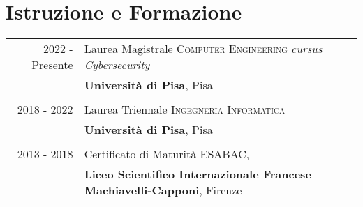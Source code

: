 \documentclass[a4paper,10pt]{article} %
\begin{document}

\section{Istruzione e Formazione}

\begin{tabular}{rl}	



2022 - Presente & Laurea Magistrale \textsc{Computer Engineering} \small\emph{cursus Cybersecurity}\\
& \textbf{Università di Pisa}, Pisa\\
&\\


2018 - 2022 & Laurea Triennale \textsc{Ingegneria Informatica}\\%
&\textbf{Università di Pisa}, Pisa\\
&\\


2013 - 2018 & Certificato di Maturità \textsc{ESABAC},\\
&\textbf{Liceo Scientifico Internazionale Francese Machiavelli-Capponi}, Firenze
\end{tabular}


%
%
\end{document}
